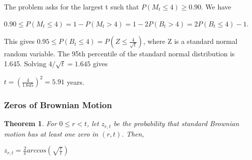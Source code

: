 \documentclass[12pt]{article}
\newtheorem{theorem}{Theorem}
\begin{document}
\noindent The problem asks for the largest t such that $P(M_t \leq 4) \geq 0.90$. We have
\begin{center}
    $0.90 \leq P(M_t \leq 4) = 1 - P(M_t > 4) = 1 - 2P(B_t > 4) = 2P(B_t \leq 4) - 1$.
\end{center}
This gives $0.95 \leq P(B_t \leq 4) = P(Z \leq \frac{4}{\sqrt{t}})$,
where Z is a standard normal random variable. The 95th percentile of the standard normal distribution is 1.645. Solving $4/\sqrt{t}=1.645$ gives
\begin{center}
    $t = (\frac{4}{1.645})^2 = 5.91$ years.
\end{center}

\subsubsection{Zeros of Brownian Motion}

\begin{theorem}
    For $0 \leq r < t$, let $z_{r,t}$ be the probability that standard Brownian motion has at least one zero in $(r,t)$. Then,
    \begin{center}
        $z_{r,t}=\frac{2}{\pi}arccos(\sqrt{\frac{r}{t}})$
    \end{center}
\end{theorem}
\end{document}
